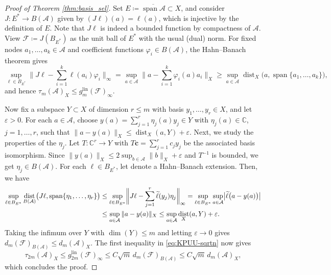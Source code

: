 \documentclass[11pt,reqno, a4paper]{article}
\numberwithin{equation}{section}
\DeclareMathOperator{\dist}{dist}
\newcommand{\C}{\mathbb{C}}
\newcommand{\lin}{\ensuremath{\mathrm{lin}}}
\DeclareMathOperator{\spann}{span}
\begin{document}
\begin{proof}[Proof of Theorem \ref{thm:basis_sel}]
Set $E\coloneqq\overline{\spann\mathcal A} \subset X$, and consider $J\colon E^*\to B(\mathcal A)$ given by $(J\ell)(a)=\ell(a)$, which is injective by the definition of $E$.
Note that $J\ell$ is indeed a bounded function by compactness of $\mathcal A$.
View $\mathcal{F}\coloneqq J(B_{E^*})$ as the unit ball of $E^*$ with the usual (dual) norm.
For fixed nodes $a_1,\ldots,a_k\in\mathcal A$ and coefficient functions $\varphi_i\in B(\mathcal A)$, the Hahn--Banach theorem gives
\begin{equation}
    \sup_{\ell\in B_{E^*}} \biggl\|J\ell-\sum_{i=1}^k\ell(a_i)\varphi_i\biggr\|_\infty
    =\sup_{a\in\mathcal A} \biggl\|a-\sum_{i=1}^k\varphi_i(a)a_i\biggr\|_X \geq \sup_{a\in\mathcal A}\dist_X \bigl(a,\spann\{a_1,\ldots,a_k\}\bigr),
\end{equation}
and hence $\tau_m(\mathcal A)_X\le g_m^{\lin}(\mathcal F)_\infty$.

Now fix a subspace $Y\subset X$ of dimension $r\le m$ with basis $y_1,\ldots,y_r \in X$, and let $\varepsilon>0$.
For each $a\in\mathcal A$, choose $y(a)=\sum_{j=1}^r\eta_j(a)y_j\in Y$ with $\eta_j(a) \in \C$, $j=1,\ldots,r$, such that $\|a-y(a)\|_X\le\dist_X(a,Y)+\varepsilon$.
Next, we study the properties of the $\eta_j$.
Let \(T\colon \mathbb C^r\to Y\) with \(T\mathbf c=\sum_{j=1}^r c_jy_j\) be the associated basis isomorphism.
Since \(\|y(a)\|_X\le2\sup_{b\in\mathcal A}\|b\|_X+\varepsilon\) and \(T^{-1}\) is bounded, we get \(\eta_j \in B(\mathcal A)\).
For each $\ell\in B_{E^*}$, let  denote a Hahn--Banach extension.
Then, we have
\begin{align}
\sup_{\ell\in B_{E^*}}
\dist_{B(\mathcal A)}\bigl(J\ell,\spann\{\eta_1,\ldots,\eta_r\}\bigr)
&\le
\sup_{\ell\in B_{E^*}}
\biggl\|J\ell-\sum_{j=1}^r\widetilde\ell(y_j)\eta_j\biggr\|_\infty
\notag =
\sup_{\ell\in B_{E^*}}\sup_{a\in\mathcal A}
\bigl|\widetilde\ell\bigl(a-y(a)\bigr)\bigr|
\notag\\
&\le
\sup_{a\in\mathcal A}\|a-y(a)\|_X \le
\sup_{a\in\mathcal A}\dist_X(a,Y)+\varepsilon.
\end{align}
Taking the infimum over $Y$ with $\dim(Y) \leq m$ and letting $\varepsilon \to 0$ gives $d_m(\mathcal F)_{B(\mathcal A)}\le d_m(\mathcal A)_X$.
The first inequality in \eqref{eq:KPUU-sqrtn} now gives
\begin{equation}\label{eq:ProofFinal}
    \tau_{2m}(\mathcal A)_X
    \le g_{2m}^{\lin}(\mathcal F)_\infty
    \le C\sqrt m\,d_m(\mathcal F)_{B(\mathcal A)}
    \le C\sqrt m\,d_m(\mathcal A)_X,
\end{equation}
which concludes the proof.
\end{proof}
\end{document}
